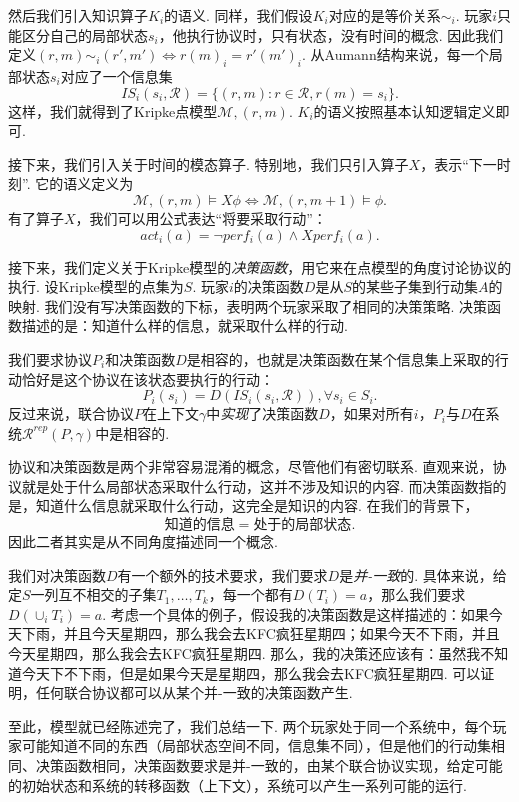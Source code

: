 然后我们引入知识算子$K_i$的语义. 同样，我们假设$K_i$对应的是等价关系$\sim_i$. 玩家$i$只能区分自己的局部状态$s_i$，他执行协议时，只有状态，没有时间的概念. 因此我们定义$(r,m)\sim_i (r',m')\iff r(m)_i=r'(m')_i$. 从Aumann结构来说，每一个局部状态$s_i$对应了一个信息集
    \[IS_i(s_i,\mathcal R)=\{(r,m):r\in\mathcal R,r(m)=s_i\}.\]
这样，我们就得到了Kripke点模型$\mathcal M,(r,m)$. $K_i$的语义按照基本认知逻辑定义即可.

接下来，我们引入关于时间的模态算子. 特别地，我们只引入算子$X$，表示“下一时刻”. 它的语义定义为
    \[\mathcal M,(r,m)\vDash X\phi\iff\mathcal M,(r,m+1)\vDash\phi.\]
有了算子$X$，我们可以用公式表达“将要采取行动”：
    \[act_i(a)=\neg perf_i(a)\wedge X perf_i(a).\]

接下来，我们定义关于Kripke模型的\emph{决策函数}，用它来在点模型的角度讨论协议的执行. 设Kripke模型的点集为$S$. 玩家$i$的决策函数$D$是从$S$的某些子集到行动集$A$的映射. 我们没有写决策函数的下标，表明两个玩家采取了相同的决策策略. 决策函数描述的是：知道什么样的信息，就采取什么样的行动. 

我们要求协议$P_i$和决策函数$D$是相容的，也就是决策函数在某个信息集上采取的行动恰好是这个协议在该状态要执行的行动：
    \[P_i(s_i)=D(IS_i(s_i,\mathcal R)),\forall s_i\in S_i.\]
反过来说，联合协议$P$在上下文$\gamma$中\emph{实现}了决策函数$D$，如果对所有$i$，$P_i$与$D$在系统$\mathcal R^{rep}(P,\gamma)$中是相容的.

协议和决策函数是两个非常容易混淆的概念，尽管他们有密切联系. 直观来说，协议就是处于什么局部状态采取什么行动，这并不涉及知识的内容. 而决策函数指的是，知道什么信息就采取什么行动，这完全是知识的内容. 在我们的背景下，
    \[\text{知道的信息}=\text{处于的局部状态}.\]
因此二者其实是从不同角度描述同一个概念.

我们对决策函数$D$有一个额外的技术要求，我们要求$D$是\emph{并-一致}的. 具体来说，给定$S$一列互不相交的子集$T_1,\dots,T_k$，每一个都有$D(T_i)=a$，那么我们要求$D(\cup_i T_i)=a$. 考虑一个具体的例子，假设我的决策函数是这样描述的：如果今天下雨，并且今天星期四，那么我会去KFC疯狂星期四；如果今天不下雨，并且今天星期四，那么我会去KFC疯狂星期四. 那么，我的决策还应该有：虽然我不知道今天下不下雨，但是如果今天是星期四，那么我会去KFC疯狂星期四. 可以证明，任何联合协议都可以从某个并-一致的决策函数产生.


至此，模型就已经陈述完了，我们总结一下. 两个玩家处于同一个系统中，每个玩家可能知道不同的东西（局部状态空间不同，信息集不同），但是他们的行动集相同、决策函数相同，决策函数要求是并-一致的，由某个联合协议实现，给定可能的初始状态和系统的转移函数（上下文），系统可以产生一系列可能的运行.

